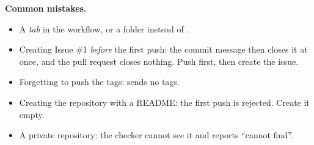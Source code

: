\textbf{Common mistakes.}
\begin{itemize}
  \item A \emph{tab} in the workflow, or a folder  instead of .
  \item Creating Issue \#1 \emph{before} the first push: the commit message  then closes it at once, and the pull request closes nothing. Push first, then create the issue.
  \item Forgetting to push the tags:  sends no tags.
  \item Creating the repository with a README: the first push is rejected. Create it empty.
  \item A private repository: the checker cannot see it and reports ``cannot find''.
\end{itemize}
